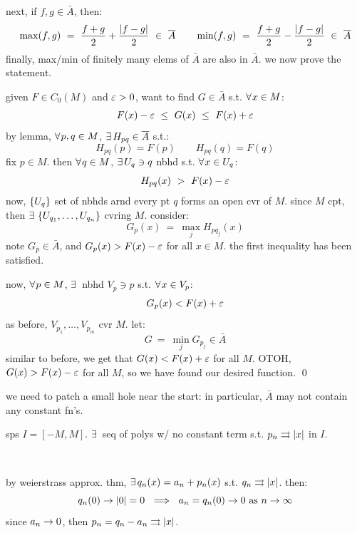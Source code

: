 next, if $f,g\in\bar{A}$, then:
\begin{equation*}
	\max(f,g) \ = \ \frac{f+g}{2}+\frac{\abs{f-g}}{2} \ \in \ \bar{A} \qquad
	\min(f,g) \ = \ \frac{f+g}{2}-\frac{\abs{f-g}}{2} \ \in \ \bar{A}
\end{equation*}
finally, max/min of finitely many elems of $\bar{A}$ are also in $\bar{A}$.
we now prove the statement.

given $F\in C_{0}(M)$ and $\varepsilon>0$, want to find $G\in\bar{A}$ s.t. $\fa x\in M$:
\begin{equation*}
	F(x)-\varepsilon \ \leq \ G(x) \ \leq \ F(x)+\varepsilon
\end{equation*}
by lemma, $\fa p,q\in M$, $\ex H_{pq}\in\bar{A}$ s.t.:
\begin{equation*}
	H_{pq}(p)=F(p) \qquad H_{pq}(q)=F(q)
\end{equation*}
fix $p\in M$. then $\fa q\in M$, $\ex U_{q}\ni q$ nbhd s.t. $\fa x\in U_{q}$:
\begin{equation*}
	H_{pq}(x) \ > \ F(x)-\varepsilon
\end{equation*}
now, $\left\{{U_{q}}\right\}$ set of nbhds arnd every pt $q$ forms an open cvr of $M$.
since $M$ cpt, then $\ex\set{U_{q_{1}},\dots,U_{q_{n}}}$ cvring $M$. consider:
\begin{equation*}
	G_{p}(x) \ = \ \max_{j}H_{pq_{j}}(x)
\end{equation*}
note $G_{p}\in\bar{A}$, and $G_{p}(x)>F(x)-\varepsilon$ for all $x\in M$.
the first inequality has been satisfied.

now, $\fa p\in M$, $\ex$ nbhd $V_{p}\ni p$ s.t. $\fa x\in V_{p}$:
\begin{equation*}
	G_{p}(x)<F(x)+\varepsilon
\end{equation*}
as before, $V_{p_{1}},\dots,V_{p_{m}}$ cvr $M$. let:
\begin{equation*}
	G \ = \ \min_{j}G_{p_{j}}\in\bar{A}
\end{equation*}
similar to before, we get that $G(x)<F(x)+\varepsilon$ for all $M$.
OTOH, $G(x)>F(x)-\varepsilon$ for all $M$, so we have found our desired function.
\qed

we need to patch a small hole near the start:
in particular, $\bar{A}$ may not contain any constant fn's.
\begin{lm}
	sps $I=[-M,M]$. $\ex$ seq of polys w/ no constant term s.t.
	$p_{n}\rightrightarrows\abs{x}$ in $I$.
\end{lm} \

\begin{pf}[source=Primary Source Material]
	by weierstrass approx. thm, $\ex q_{n}(x)=a_{n}+p_{n}(x)$ s.t.
	$q_{n}\rightrightarrows\abs{x}$. then:
	\begin{equation*}
		q_{n}(0)\sto\abs{0}=0 \ \implies \ a_{n}=q_{n}(0)\sto0 \trm{ as } n\sto\infty
	\end{equation*}
	since $a_{n}\rightarrow0$, then $p_{n}=q_{n}-a_{n}\rightrightarrows\abs{x}$.
\end{pf}

